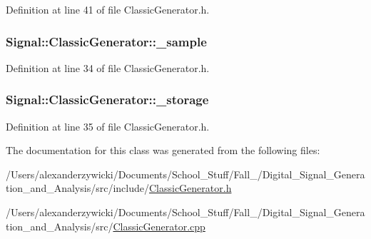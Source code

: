 Definition at line 41 of file Classic\+Generator.\+h.

\hypertarget{class_signal_1_1_classic_generator_a40313d0d806d6e44af7d41b3ef3a0822}{
\subsubsection[{\+\_\+sample}]{ Signal\+::\+Classic\+Generator\+::\+\_\+sample\hspace{0.3cm}{\ttfamily [protected]}}}\label{class_signal_1_1_classic_generator_a40313d0d806d6e44af7d41b3ef3a0822}


Definition at line 34 of file Classic\+Generator.\+h.

\hypertarget{class_signal_1_1_classic_generator_a1214faf589eccb01631700723900bbf9}{
\subsubsection[{\+\_\+storage}]{ Signal\+::\+Classic\+Generator\+::\+\_\+storage\hspace{0.3cm}{\ttfamily [protected]}}}\label{class_signal_1_1_classic_generator_a1214faf589eccb01631700723900bbf9}


Definition at line 35 of file Classic\+Generator.\+h.



The documentation for this class was generated from the following files\+:\begin{DoxyCompactItemize}
\item 
/\+Users/alexanderzywicki/\+Documents/\+School\+\_\+\+Stuff/\+Fall\+\_/\+Digital\+\_\+\+Signal\+\_\+\+Generation\+\_\+and\+\_\+\+Analysis/src/include/\hyperlink{_classic_generator_8h}{Classic\+Generator.\+h}\item 
/\+Users/alexanderzywicki/\+Documents/\+School\+\_\+\+Stuff/\+Fall\+\_/\+Digital\+\_\+\+Signal\+\_\+\+Generation\+\_\+and\+\_\+\+Analysis/src/\hyperlink{_classic_generator_8cpp}{Classic\+Generator.\+cpp}\end{DoxyCompactItemize}
